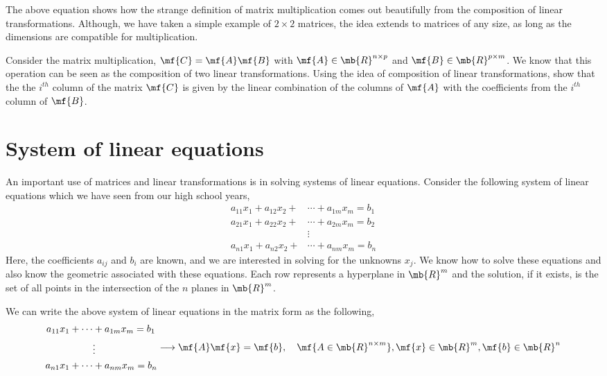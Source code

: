 The above equation shows how the strange definition of matrix multiplication comes out beautifully from the composition of linear transformations. Although, we have taken a simple example of $2 \times 2$ matrices, the idea extends to matrices of any size, as long as the dimensions are compatible for multiplication.

\begin{boxedstuff}
    \begin{problem}
        Consider the matrix multiplication, $\mf{C} = \mf{A}\mf{B}$ with $\mf{A} \in \mb{R}^{n \times p}$ and $\mf{B} \in \mb{R}^{p \times m}$. We know that this operation can be seen as the composition of two linear transformations. Using the idea of composition of linear transformations, show that the the $i^{th}$ column of the matrix $\mf{C}$ is given by the linear combination of the columns of $\mf{A}$ with the coefficients from the $i^{th}$ column of $\mf{B}$.
    \end{problem}
\end{boxedstuff}

\section{System of linear equations}\label{sec:ch03-sys-lin-eqn}
An important use of matrices and linear transformations is in solving systems of linear equations. Consider the following system of linear equations which we have seen from our high school years,
\begin{equation}
    \begin{split}
        a_{11}x_1 + a_{12}x_2 + &\cdots + a_{1m}x_m = b_1\\
        a_{21}x_1 + a_{22}x_2 + &\cdots + a_{2m}x_m = b_2\\
        &\vdots\\
        a_{n1}x_1 + a_{n2}x_2 + &\cdots + a_{nm}x_m = b_n
    \end{split}
    \label{eq:ch03-sys-lin-eqn}
\end{equation}
Here, the coefficients $a_{ij}$ and $b_{i}$ are known, and we are interested in solving for the unknowns $x_{j}$. We know how to solve these equations and also know the geometric associated with these equations. Each row represents a hyperplane in $\mb{R}^m$ and the solution, if it exists, is the set of all points in the intersection of the $n$ planes in $\mb{R}^m$.

We can write the above system of linear equations in the matrix form as the following,
\begin{equation}
    \begin{split}
        a_{11}x_1 + \cdots& + a_{1m}x_m = b_1\\
        &\vdots\\
        a_{n1}x_1 + \cdots& + a_{nm}x_m = b_n
    \end{split} \longrightarrow \mf{A}\mf{x} = \mf{b}, \quad \mf{A \in \mb{R}^{n \times m}}, \mf{x} \in \mb{R}^m, \mf{b} \in \mb{R}^n
\end{equation}

